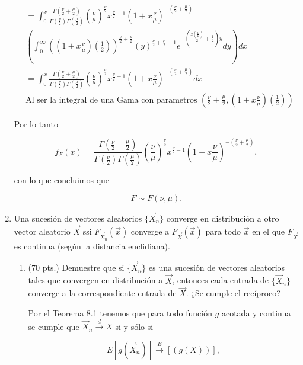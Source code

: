 \documentclass[letterpaper]{article}
\theoremstyle{definition}
\theoremstyle{lemathm}
\theoremstyle{lemathm}
\theoremstyle{lemademthm}
\newcommand{\pars}[1]{\left( #1 \right) }
\newcommand{\bracs}[1]{\left[ #1 \right] }
\newcommand{\1}{\mathbbm{1}}
\begin{document}
\begin{enumerate}
\begin{align*}
			&= \int_{0}^{x} \frac{\Gamma\pars{\frac{\nu}{2}+\frac{\mu}{2}}}{\Gamma\pars{\frac{\nu}{2}}\Gamma\pars{\frac{\mu}{2}}} \pars{\frac{\nu}{\mu}}^{\frac{\nu}{2}} x^{\frac{\nu}{2}-1} \pars{1 + x\frac{\nu}{\mu}}^{-\pars{\frac{\nu}{2} + \frac{\mu}{2}}}\\ &\pars{\int_{0}^{\infty} \pars{\pars{1 + x\frac{\nu}{\mu}}\pars{\frac{1}{2}}}^{\frac{\nu}{2} + \frac{\mu}{2}} \pars{y}^{\frac{\nu}{2} + \frac{\mu}{2} -1} e^{-\pars{\frac{x\pars{\frac{\nu}{\mu}}}{2} + \frac{1}{2}}y} dy} dx\\
			&= \int_{0}^{x} \frac{\Gamma\pars{\frac{\nu}{2}+\frac{\mu}{2}}}{\Gamma\pars{\frac{\nu}{2}}\Gamma\pars{\frac{\mu}{2}}} \pars{\frac{\nu}{\mu}}^{\frac{\nu}{2}} x^{\frac{\nu}{2}-1} \pars{1 + x\frac{\nu}{\mu}}^{-\pars{\frac{\nu}{2} + \frac{\mu}{2}}} dx\\
			& \text{Al ser la integral de una Gama con parametros $\pars{\frac{\nu}{2} + \frac{\mu}{2},\pars{1 + x\frac{\nu}{\mu}}\pars{\frac{1}{2}}}$}
		\end{align*}

		Por lo tanto

		\[f_F(x) = \frac{\Gamma\pars{\frac{\nu}{2}+\frac{\mu}{2}}}{\Gamma\pars{\frac{\nu}{2}}\Gamma\pars{\frac{\mu}{2}}} \pars{\frac{\nu}{\mu}}^{\frac{\nu}{2}} x^{\frac{\nu}{2}-1} \pars{1 + x\frac{\nu}{\mu}}^{-\pars{\frac{\nu}{2} + \frac{\mu}{2}}},\]

		con lo que concluimos que

		\[F \sim F(\nu,\mu).\]

		\newpage

		\item Una sucesión de vectores aleatorios $\{\vec{X}_n\}$ converge en distribución a otro vector aleatorio $\vec{X}$ ssi $F_{\vec{X}_n}(\vec{x})$ converge a $F_{\vec{X}}(\vec{x})$ para todo $\vec{x}$ en el que $F_{\vec{X}}$ es continua (según la distancia euclidiana).
		
		\begin{enumerate}
		
			\item (70 pts.) Demuestre que si $\{\vec{X}_n\}$ es una sucesión de vectores aleatorios tales que convergen en distribución a $\vec{X}$, entonces cada entrada de $\{\vec{X}_n\}$ converge a la correspondiente entrada de $\vec{X}$. ¿Se cumple el recíproco?
			
			Por el Teorema 8.1 tenemos que para todo función $g$ acotada y continua se cumple que $\vec{X}_n \xrightarrow{d} X$ si y sólo si
			
			\[E\bracs{g\pars{\vec{X}_n}} \xrightarrow E\bracs{\pars{g(X)}},\]


\end{enumerate}
\end{enumerate}
\end{document}
